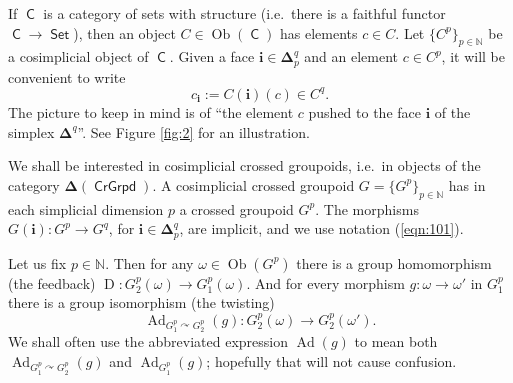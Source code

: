 \documentclass[a4paper, 10pt]{amsart}
\theoremstyle{definition}
\numberwithin{equation}{section}
\newcommand{\opn}{\operatorname}
\newcommand{\cat}[1]{\operatorname{\mathsf{#1}}}
\newcommand{\mbb}[1]{\mathbb{#1}}
\newcommand{\bsym}[1]{\boldsymbol{#1}}
\newcommand{\N}{\mbb{N}}
\newcommand{\om}{\omega}
\begin{document}
If $\cat{C}$ is a category of sets with structure (i.e.\ there is a
faithful functor $\cat{C} \to \cat{Set}$), then an object 
$C \in \opn{Ob}(\cat{C})$ has elements $c \in C$. 
Let $\{ C^p \}_{p \in \mbb{N}}$ be a cosimplicial object of $\cat{C}$. 
Given a face $\bsym{i} \in \bsym{\Delta}_p^q$
and an element $c \in C^p$, it will be convenient to write
\begin{equation} \label{eqn:101}
c_{\bsym{i}} := C(\bsym{i})(c) \in C^q .
\end{equation}
The picture to keep in mind is of ``the element $c$ pushed to the face
$\bsym{i}$ of the simplex $\bsym{\Delta}^q$''. 
See Figure \ref{fig:2} for an illustration.

We shall be interested in cosimplicial crossed groupoids, i.e.\ in objects of
the category $\bsym{\Delta}(\cat{CrGrpd})$. A cosimplicial crossed groupoid 
$G = \{ G^p \}_{p \in \mbb{N}}$
has in each simplicial dimension $p$ a crossed groupoid $G^p$. 
The morphisms $G(\bsym{i}) : G^p \to G^q$, 
for $\bsym{i} \in \bsym{\Delta}_p^q$, are implicit, and we use notation
(\ref{eqn:101}). 

Let us fix $p \in \N$. Then for any 
$\om \in \opn{Ob}(G^p)$ there is a group homomorphism  (the feedback)
$\opn{D} : G^p_2(\om) \to  G^p_1(\om)$.
And for every morphism $g : \om \to \om'$ in $G_1^p$ there is a group
isomorphism (the twisting)
\[ \opn{Ad}_{G^p_1 \curvearrowright G^p_{2}}(g) :
G^p_2(\om) \to G^p_2(\om') . \]
We shall often use the abbreviated expression
$\opn{Ad}(g)$ to mean both $\opn{Ad}_{G^p_1 \curvearrowright G^p_{2}}(g)$
and 
$\opn{Ad}_{G^p_1}(g)$; hopefully that will not cause confusion.
\end{document}

